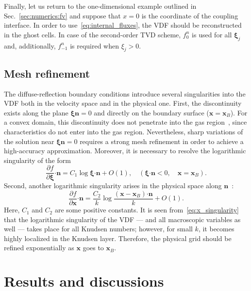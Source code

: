 \documentclass{elsarticle} %
\newcommand{\pder}[2][]{\frac{\partial#1}{\partial#2}}
\newcommand{\OO}[1]{O(#1)}
\newcommand{\bxi}{\boldsymbol{\xi}}
\newcommand{\bn}{\boldsymbol{n}}
\newcommand{\bdot}{\boldsymbol{\cdot}}
\newcommand{\bx}{\boldsymbol{x}}
\begin{document}
Finally, let us return to the one-dimensional example outlined in Sec.~\ref{sec:numerics:fv}
and suppose that \(x=0\) is the coordinate of the coupling interface.
In order to use~\eqref{eq:internal_fluxes}, the VDF should be reconstructed in the ghost cells.
In case of the second-order TVD scheme, \(f^n_0\) is used for all \(\bxi_j\) and, additionally,
\(f^n_{-1}\) is required when \(\xi_j>0\).


\subsection{Mesh refinement}\label{sec:numerics:refinement}

The diffuse-reflection boundary conditions introduce several singularities into the VDF
both in the velocity space and in the physical one.
First, the discontinuity exists along the plane \(\bxi\bn=0\) and directly on the boundary surface (\(\bx=\bx_B\)).
For a convex domain, this discontinuity does not penetrate into the gas region~\cite{Kim2011, Guo2017},
since characteristics do not enter into the gas region.
Nevertheless, sharp variations of the solution near \(\bxi\bn=0\) requires a strong mesh refinement
in order to achieve a high-accuracy approximation.
Moreover, it is necessary to resolve the logarithmic singularity of the form~\cite{Takata2016}
\begin{equation}\label{eq:xi_singularity}
    \pder[f]{\bxi}\bdot\bn = C_1\log\bxi\bdot\bn + \OO{1}, \quad (\bxi\bdot\bn<0, \quad \bx=\bx_B).
\end{equation}
Second, another logarithmic singularity arises in the physical space along \(\bn\)~\cite{Takata2014}:
\begin{equation}\label{eq:x_singularity}
    \pder[f]{\bx}\bdot\bn = \frac{C_2}{k}\log\frac{(\bx-\bx_B)\bdot\bn}{k} + \OO{1}.
\end{equation}
Here, \(C_1\) and \(C_2\) are some positive constants.
It is seen from~\eqref{eq:x_singularity} that the logarithmic singularity of the VDF
--- and all macroscopic variables as well --- takes place for all Knudsen numbers;
however, for small \(k\), it becomes highly localized in the Knudsen layer.
Therefore, the physical grid should be refined exponentially as \(\bx\) goes to \(\bx_B\).

\section{Results and discussions}\label{sec:results}
\end{document}
